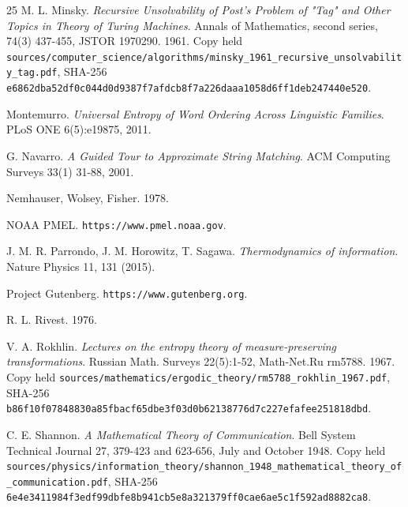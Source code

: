 \begin{thebibliography}{25}
M. L. Minsky. \emph{Recursive Unsolvability of Post's Problem of "Tag" and Other Topics in Theory of Turing Machines}. Annals of Mathematics, second series, 74(3) 437-455, JSTOR 1970290. 1961.\newline
{\footnotesize Copy held \texttt{sources/\allowbreak{}computer\_\allowbreak{}science/\allowbreak{}algorithms/\allowbreak{}minsky\_\allowbreak{}1961\_\allowbreak{}recursive\_\allowbreak{}unsolvability\_\allowbreak{}tag.pdf}, SHA-256 \texttt{e6862dba52df0c044d0d9387f7afdcb8f7a226daaa1058d6ff1deb247440e520}.}

Montemurro. \emph{Universal Entropy of Word Ordering Across Linguistic Families}. PLoS ONE 6(5):e19875, 2011.

G. Navarro. \emph{A Guided Tour to Approximate String Matching}. ACM Computing Surveys 33(1) 31-88, 2001.

Nemhauser, Wolsey, Fisher. 1978.

NOAA PMEL. \texttt{https:/\allowbreak{}/\allowbreak{}www.pmel.noaa.gov}.

J. M. R. Parrondo, J. M. Horowitz, T. Sagawa. \emph{Thermodynamics of information}. Nature Physics 11, 131 (2015).

Project Gutenberg. \texttt{https:/\allowbreak{}/\allowbreak{}www.gutenberg.org}.

R. L. Rivest. 1976.

V. A. Rokhlin. \emph{Lectures on the entropy theory of measure-preserving transformations}. Russian Math. Surveys 22(5):1-52, Math-Net.Ru rm5788. 1967.\newline
{\footnotesize Copy held \texttt{sources/\allowbreak{}mathematics/\allowbreak{}ergodic\_\allowbreak{}theory/\allowbreak{}rm5788\_\allowbreak{}rokhlin\_\allowbreak{}1967.pdf}, SHA-256 \texttt{b86f10f07848830a85fbacf65dbe3f03d0b62138776d7c227efafee251818dbd}.}

C. E. Shannon. \emph{A Mathematical Theory of Communication}. Bell System Technical Journal 27, 379-423 and 623-656, July and October 1948.\newline
{\footnotesize Copy held \texttt{sources/\allowbreak{}physics/\allowbreak{}information\_\allowbreak{}theory/\allowbreak{}shannon\_\allowbreak{}1948\_\allowbreak{}mathematical\_\allowbreak{}theory\_\allowbreak{}of\_\allowbreak{}communication.pdf}, SHA-256 \texttt{6e4e3411984f3edf99dbfe8b941cb5e8a321379ff0cae6ae5c1f592ad8882ca8}.}


\end{thebibliography}
